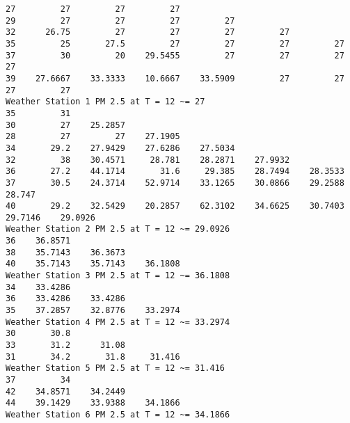 \documentclass{exam}
\begin{document}
\begin{enumerate}
\begin{verbatim}
27         27         27         27
29         27         27         27         27
32      26.75         27         27         27         27
35         25       27.5         27         27         27         27
37         30         20    29.5455         27         27         27         27
39    27.6667    33.3333    10.6667    33.5909         27         27         27         27
Weather Station 1 PM 2.5 at T = 12 ~= 27
35         31
30         27    25.2857
28         27         27    27.1905
34       29.2    27.9429    27.6286    27.5034
32         38    30.4571     28.781    28.2871    27.9932
36       27.2    44.1714       31.6     29.385    28.7494    28.3533
37       30.5    24.3714    52.9714    33.1265    30.0866    29.2588     28.747
40       29.2    32.5429    20.2857    62.3102    34.6625    30.7403    29.7146    29.0926
Weather Station 2 PM 2.5 at T = 12 ~= 29.0926
36    36.8571
38    35.7143    36.3673
40    35.7143    35.7143    36.1808
Weather Station 3 PM 2.5 at T = 12 ~= 36.1808
34    33.4286
36    33.4286    33.4286
35    37.2857    32.8776    33.2974
Weather Station 4 PM 2.5 at T = 12 ~= 33.2974
30       30.8
33       31.2      31.08
31       34.2       31.8     31.416
Weather Station 5 PM 2.5 at T = 12 ~= 31.416
37         34
42    34.8571    34.2449
44    39.1429    33.9388    34.1866
Weather Station 6 PM 2.5 at T = 12 ~= 34.1866


\end{verbatim}
\end{enumerate}
\end{document}
